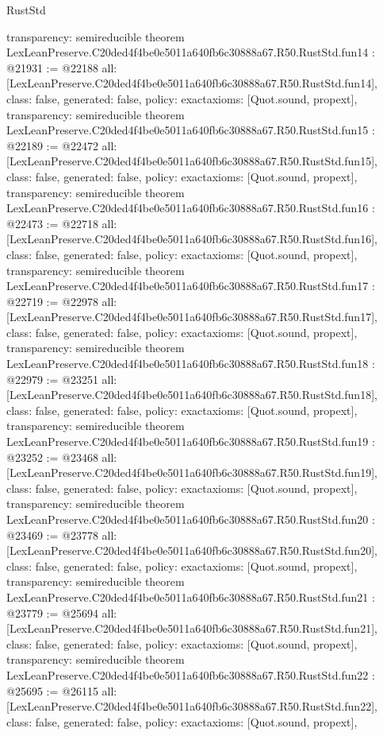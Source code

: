 \begin{lexlean}{RustStd}
\begin{coremodule}
{  transparency: semireducible
}
theorem LexLeanPreserve.C20ded4f4be0e5011a640fb6c30888a67.R50.RustStd.fun14 : @21931 := @22188 {
  all: [LexLeanPreserve.C20ded4f4be0e5011a640fb6c30888a67.R50.RustStd.fun14],
  class: false,
  generated: false,
  policy: exact{axioms: [Quot.sound, propext]},
  transparency: semireducible
}
theorem LexLeanPreserve.C20ded4f4be0e5011a640fb6c30888a67.R50.RustStd.fun15 : @22189 := @22472 {
  all: [LexLeanPreserve.C20ded4f4be0e5011a640fb6c30888a67.R50.RustStd.fun15],
  class: false,
  generated: false,
  policy: exact{axioms: [Quot.sound, propext]},
  transparency: semireducible
}
theorem LexLeanPreserve.C20ded4f4be0e5011a640fb6c30888a67.R50.RustStd.fun16 : @22473 := @22718 {
  all: [LexLeanPreserve.C20ded4f4be0e5011a640fb6c30888a67.R50.RustStd.fun16],
  class: false,
  generated: false,
  policy: exact{axioms: [Quot.sound, propext]},
  transparency: semireducible
}
theorem LexLeanPreserve.C20ded4f4be0e5011a640fb6c30888a67.R50.RustStd.fun17 : @22719 := @22978 {
  all: [LexLeanPreserve.C20ded4f4be0e5011a640fb6c30888a67.R50.RustStd.fun17],
  class: false,
  generated: false,
  policy: exact{axioms: [Quot.sound, propext]},
  transparency: semireducible
}
theorem LexLeanPreserve.C20ded4f4be0e5011a640fb6c30888a67.R50.RustStd.fun18 : @22979 := @23251 {
  all: [LexLeanPreserve.C20ded4f4be0e5011a640fb6c30888a67.R50.RustStd.fun18],
  class: false,
  generated: false,
  policy: exact{axioms: [Quot.sound, propext]},
  transparency: semireducible
}
theorem LexLeanPreserve.C20ded4f4be0e5011a640fb6c30888a67.R50.RustStd.fun19 : @23252 := @23468 {
  all: [LexLeanPreserve.C20ded4f4be0e5011a640fb6c30888a67.R50.RustStd.fun19],
  class: false,
  generated: false,
  policy: exact{axioms: [Quot.sound, propext]},
  transparency: semireducible
}
theorem LexLeanPreserve.C20ded4f4be0e5011a640fb6c30888a67.R50.RustStd.fun20 : @23469 := @23778 {
  all: [LexLeanPreserve.C20ded4f4be0e5011a640fb6c30888a67.R50.RustStd.fun20],
  class: false,
  generated: false,
  policy: exact{axioms: [Quot.sound, propext]},
  transparency: semireducible
}
theorem LexLeanPreserve.C20ded4f4be0e5011a640fb6c30888a67.R50.RustStd.fun21 : @23779 := @25694 {
  all: [LexLeanPreserve.C20ded4f4be0e5011a640fb6c30888a67.R50.RustStd.fun21],
  class: false,
  generated: false,
  policy: exact{axioms: [Quot.sound, propext]},
  transparency: semireducible
}
theorem LexLeanPreserve.C20ded4f4be0e5011a640fb6c30888a67.R50.RustStd.fun22 : @25695 := @26115 {
  all: [LexLeanPreserve.C20ded4f4be0e5011a640fb6c30888a67.R50.RustStd.fun22],
  class: false,
  generated: false,
  policy: exact{axioms: [Quot.sound, propext]},
}
\end{coremodule}
\end{lexlean}
